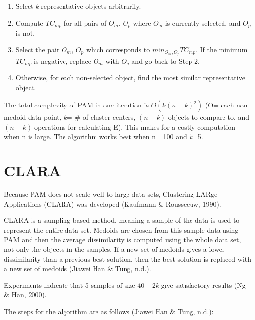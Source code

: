 \documentclass[12pt,twoside]{amherstthesis}
\begin{document}
  \begin{enumerate}
  \def\labelenumi{\arabic{enumi}.}
  \item
    Select \emph{k} representative objects arbitrarily.
  \item
    Compute \(TC_{mp}\) for all pairs of \(O_m\), \(O_p\) where \(O_m\) is
    currently selected, and \(O_p\) is not.
  \item
    Select the pair \(O_m\), \(O_p\) which corresponds to
    \(min_{O_m, O_p} TC_{mp}\). If the minimum \(TC_{mp}\) is negative,
    replace \(O_m\) with \(O_p\) and go back to Step 2.
  \item
    Otherwise, for each non-selected object, find the most similar
    representative object.
  \end{enumerate}
  
  The total complexity of PAM in one iteration is \(O(k(n-k)^2)\) (O= each
  non-medoid data point, \emph{k}= \# of cluster centers, \((n-k)\)
  objects to compare to, and \((n-k)\) operations for calculating E). This
  makes for a costly computation when n is large. The algorithm works best
  when n= 100 and \emph{k}=5.
  
  \section{CLARA}\label{clara}
  
  Because PAM does not scale well to large data sets, Clustering LARge
  Applications (CLARA) was developed (Kaufmann \& Rousseeuw, 1990).
  
  CLARA is a sampling based method, meaning a sample of the data is used
  to represent the entire data set. Medoids are chosen from this sample
  data using PAM and then the average dissimilarity is computed using the
  whole data set, not only the objects in the samples. If a new set of
  medoids gives a lower dissimilarity than a previous best solution, then
  the best solution is replaced with a new set of medoids (Jiawei Han \&
  Tung, n.d.).
  
  Experiments indicate that 5 samples of size 40+ 2\(k\) give satisfactory
  results (Ng \& Han, 2000).
  
  The steps for the algorithm are as follows (Jiawei Han \& Tung, n.d.):
  
\end{document}
